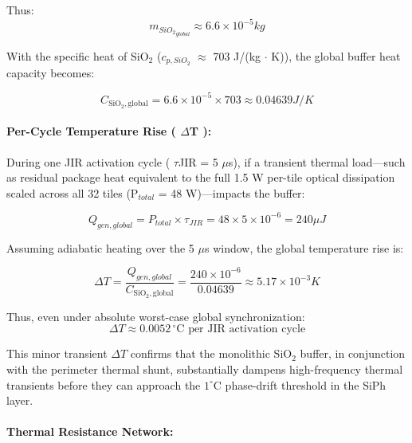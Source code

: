 \documentclass[journal]{IEEEtran}
\begin{document}
Thus:
\begin{equation}
m_{{SiO_2}_{global}} \approx 6.6 \times 10^{-5} kg
\end{equation}

With the specific heat of SiO$_2$ ($c_{p,SiO_2}$ $\approx$ 703 J/(kg $\cdot$ K)), the global buffer heat capacity becomes:

\begin{equation}
C_{\text{SiO}_2, \text{global}} = 6.6 \times 10^{-5} \times 703 \approx 0.04639 J/K
\end{equation}

\paragraph{\textbf{Per-Cycle Temperature Rise ( $\Delta$T ):}}

During one JIR activation cycle ( $\tau$JIR = 5 $\mu$s), if a transient thermal load---such as residual package heat equivalent to the full 1.5 W per-tile optical dissipation scaled across all 32 tiles (P$_{total}$ = 48 W)---impacts the buffer:

\begin{equation}
Q_{gen,global} = P_{total} \times \tau_{JIR} = 48 \times 5 \times 10^{-6} = 240 \mu J
\end{equation}

Assuming adiabatic heating over the 5 $\mu$s window, the global temperature rise is:

\begin{equation}
\Delta T = \frac {Q_{gen,global}}{C_{\text{SiO}_2, \text{global}}}
= \frac {240 \times 10^{-6}}{0.04639} \approx 5.17 \times 10^{-3} K
\end{equation}

Thus, even under absolute worst-case global synchronization:
\begin{equation}
\Delta T \approx 0.0052 \,^{\circ}\mathrm{C} \text{ per JIR activation cycle}
\end{equation}

This minor transient $\Delta T$ confirms that the monolithic $\mathrm{SiO_2}$ buffer, in conjunction with the perimeter thermal shunt, substantially dampens high-frequency thermal transients before they can approach the $1^\circ\mathrm{C}$ phase-drift threshold in the SiPh layer.

\paragraph{\textbf{Thermal Resistance Network:}}
\end{document}
